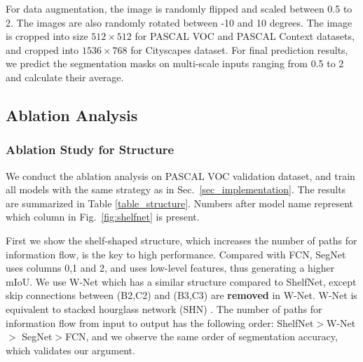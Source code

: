\documentclass[10pt,twocolumn,letterpaper]{article}
\begin{document}
For data augmentation, the image is randomly flipped and scaled between 0.5 to 2. The images are also randomly rotated between -10 and 10 degrees. The image is cropped into size $512 \times 512$ for PASCAL VOC and PASCAL Context datasets, and cropped into $1536\times 768$ for Cityscapes dataset. For final prediction results, we predict the segmentation masks on multi-scale inputs ranging from 0.5 to 2 and calculate their average.
\subsection{Ablation Analysis}
\subsubsection{Ablation Study for Structure}
We conduct the ablation analysis on PASCAL VOC validation dataset, and train all models with the same strategy as in Sec.~\ref{sec_implementation}. The results are summarized in Table \ref{table_structure}. Numbers after model name represent which column in Fig.~\ref{fig:shelfnet} is present. 

First we show the shelf-shaped structure, which increases the number of paths for information flow, is the key to high performance. Compared with FCN, SegNet uses columns 0,1 and 2, and uses low-level features, thus generating a higher mIoU. We use W-Net which has a similar structure compared to ShelfNet, except skip connections between (B2,C2) and (B3,C3) are \textbf{removed} in W-Net. W-Net is equivalent to stacked hourglass network (SHN) \cite{newell2016stacked}. The number of paths for information flow from input to output has the following order: ShelfNet$>$W-Net$>$ SegNet$>$FCN, and we observe the same order of segmentation accuracy, which validates our argument.
\end{document}

